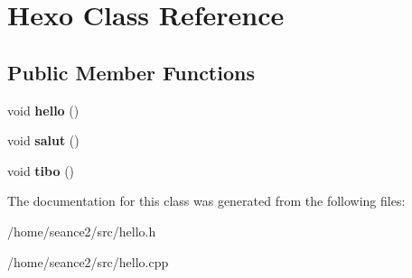 \hypertarget{classHexo}{}\section{Hexo Class Reference}
\label{classHexo}
\subsection*{Public Member Functions}
\begin{DoxyCompactItemize}
\item 
\mbox{\label{classHexo_ab708718b68951c752a901065a6d38493}} 
void {\bfseries hello} ()
\item 
\mbox{\label{classHexo_ad059bc67ea385e71002c17b4f90ea7a6}} 
void {\bfseries salut} ()
\item 
\mbox{\label{classHexo_abe86ad82f2e422e6ac09eeba2bac358e}} 
void {\bfseries tibo} ()
\end{DoxyCompactItemize}


The documentation for this class was generated from the following files\+:\begin{DoxyCompactItemize}
\item 
/home/seance2/src/hello.\+h\item 
/home/seance2/src/hello.\+cpp\end{DoxyCompactItemize}
